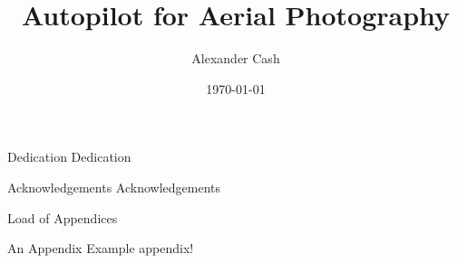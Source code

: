 \documentclass{uoyths}
\begin{document}
\begin{titlepage}[cover=true, title=true, logo=true] 
\title{Autopilot for Aerial Photography}
\author{Alexander Cash}
\date{\today}
\end{titlepage}

\begin{frontMatterEnv}

\begin{chapterEnv}{Dedication}
Dedication
\end{chapterEnv}

\begin{chapterEnv}{Acknowledgements}
Acknowledgements
\end{chapterEnv}



{\singlespacing\tableofcontents}%

\listoffigures

\listoftables

\end{frontMatterEnv}


\begin{mainMatterEnv}











\end{mainMatterEnv}

\begin{backMatterEnv}


\printglossaries



%


        \begin{chapterEnv}{Load of Appendices}
            \begin{sectionEnv}{An Appendix}
                Example appendix!
            \end{sectionEnv}
        \end{chapterEnv}


\end{backMatterEnv}
\end{document}

